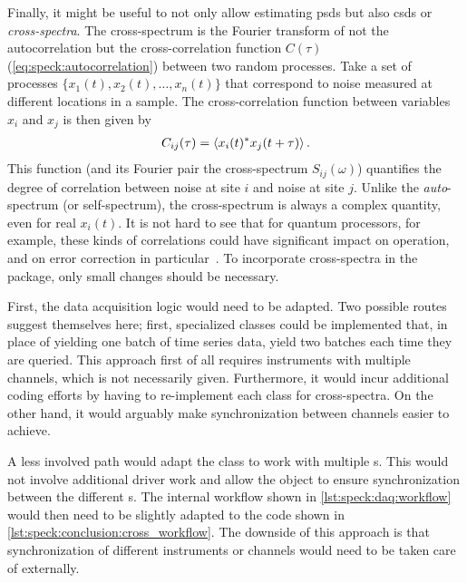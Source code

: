 Finally, it might be useful to not only allow estimating \glspl{psd} but also \glspl{csd} or \emph{cross-spectra}.
The cross-spectrum
is the Fourier transform of not the autocorrelation but the cross-correlation function $C(\tau)$ (\cref{eq:speck:autocorrelation}) between two random processes.
Take a set of processes $\{x_1(t), \allowbreak x_2(t), \allowbreak \dotsc, \allowbreak x_n(t)\}$ that correspond to noise measured at different locations in a sample.
The cross-correlation function between variables $x_i$ and $x_j$ is then given by
\begin{align}\label{eq:speck:conclusion:crosscorrelation}
    C_{ij}(\tau) = \expval{x_i(t)\conjugate x_j(t + \tau)}.
\end{align}
This function (and its Fourier pair the cross-spectrum $S_{ij}(\omega)$) quantifies the degree of correlation between noise at site $i$ and noise at site $j$.
Unlike the \emph{auto}-spectrum (or self-spectrum), the cross-spectrum is always a complex quantity, even for real $x_i(t)$.
It is not hard to see that for quantum processors, for example, these kinds of correlations could have significant impact on operation, and on error correction in particular~\cite{Aharonov2006,Nickerson2019,Clader2021}.
To incorporate cross-spectra in the \pyspeck package, only small changes should be necessary.

First, the data acquisition logic would need to be adapted.
Two possible routes suggest themselves here; first, specialized  classes could be implemented that, in place of yielding one batch of time series data, yield two batches each time they are queried.
This approach first of all requires instruments with multiple channels,
which is not necessarily given.
Furthermore, it would incur additional coding efforts by having to re-implement each  class for cross-spectra.
On the other hand, it would arguably make synchronization between channels easier to achieve.

A less involved path would adapt the  class to work with multiple s.
This would not involve additional driver work
and allow the  object to ensure synchronization between the different s.
The internal workflow shown in \cref{lst:speck:daq:workflow} would then need to be slightly adapted to the code shown in \cref{lst:speck:conclusion:cross_workflow}.
The downside of this approach is that synchronization of different instruments or channels would need to be taken care of externally.

